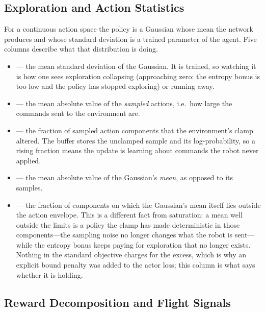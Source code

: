 \subsection{Exploration and Action Statistics}
\label{sec:metrics-rl-actions}

For a continuous action space the policy is a Gaussian whose mean the network
produces and whose standard deviation is a trained parameter of the agent.
Five columns describe what that distribution is doing.

\begin{itemize}
  \item {} --- the mean standard deviation of the Gaussian.
    It is trained, so watching it is how one sees exploration collapsing
    (approaching zero: the entropy bonus is too low and the policy has stopped
    exploring) or running away.
  \item {} --- the mean absolute value of the \emph{sampled}
    actions, i.e.\ how large the commands sent to the environment are.
  \item {} --- the fraction of sampled action components that
    the environment's clamp altered. The buffer stores the unclamped sample
    and its log-probability, so a rising fraction means the update is learning
    about commands the robot never applied.
  \item {} --- the mean absolute value of the Gaussian's
    \emph{mean}, as opposed to its samples.
  \item {} --- the fraction of components on which the
    Gaussian's mean itself lies outside the action envelope. This is a
    different fact from saturation: a mean well outside the limits is a policy
    the clamp has made deterministic in those components---the sampling noise
    no longer changes what the robot is sent---while the entropy bonus keeps
    paying for exploration that no longer exists. Nothing in the standard
    objective charges for the excess, which is why an explicit bound penalty
    was added to the actor loss; this column is what says whether it is
    holding.
\end{itemize}

\subsection{Reward Decomposition and Flight Signals}
\label{sec:metrics-rl-reward}

